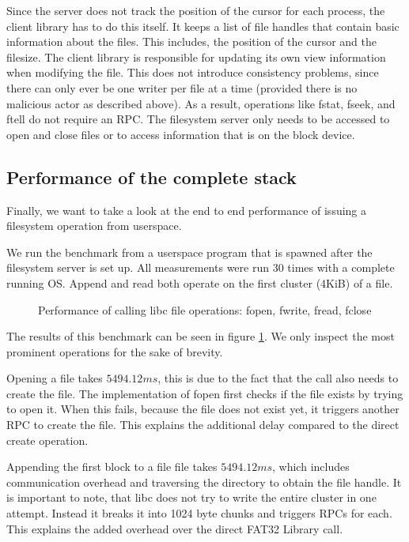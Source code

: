 Since the server does not track the position of the cursor for each process, the
client library has to do this itself.
It keeps a list of file handles that contain basic information about the files.
This includes, the position of the cursor and the filesize.
The client library is responsible for updating its own view information when
modifying the file.
This does not introduce consistency problems, since there can only ever be one
writer per file at a time (provided there is no malicious actor as described
above).
As a result, operations like fstat, fseek, and ftell do not require an RPC.
The filesystem server only needs to be accessed to open and close files or to
access information that is on the block device.

\subsection{Performance of the complete stack}

Finally, we want to take a look at the end to end performance of issuing a
filesystem operation from userspace.

We run the benchmark from a userspace program that is spawned after the filesystem server is set up.
All measurements were run 30 times with a complete running OS.
Append and read both operate on the first cluster (4KiB) of a file.

\begin{figure}[ht]
    \centering
    \scalebox{0.6}{ }
    \caption{Performance of calling libc file operations: fopen, fwrite, fread, fclose}
    \label{fig:fs_libc_e2e}
\end{figure}

The results of this benchmark can be seen in figure \ref{fig:fs_libc_e2e}.
We only inspect the most prominent operations for the sake of brevity.

Opening a file takes $5494.12ms$, this is due to the fact that the call also needs to create the file.
The implementation of fopen first checks if the file exists by trying to open it.
When this fails, because the file does not exist yet, it triggers another RPC to create the file.
This explains the additional delay compared to the direct create operation.

Appending the first block to a file file takes $5494.12ms$, which includes communication overhead and traversing the directory to obtain the file handle.
It is important to note, that libc does not try to write the entire cluster in one attempt. 
Instead it breaks it into 1024 byte chunks and triggers RPCs for each.
This explains the added overhead over the direct FAT32 Library call.

